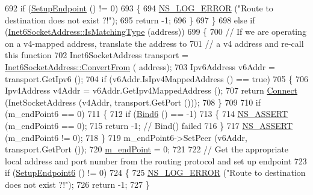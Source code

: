 \begin{DoxyCode}
692       \textcolor{keywordflow}{if} (\hyperlink{classns3_1_1TcpSocketBase_aa1e2094be5e9653b9d8d8d76b7ec670f}{SetupEndpoint} () != 0)
693         \{
694           \hyperlink{group__logging_ga0261a8db1d4ac5f79417d117634fd455}{NS\_LOG\_ERROR} (\textcolor{stringliteral}{"Route to destination does not exist ?!"});
695           \textcolor{keywordflow}{return} -1;
696         \}
697     \}
698   \textcolor{keywordflow}{else} \textcolor{keywordflow}{if} (\hyperlink{classns3_1_1Inet6SocketAddress_a4d928c54affbfb530a12076d6d7e0540}{Inet6SocketAddress::IsMatchingType} (address))
699     \{
700       \textcolor{comment}{// If we are operating on a v4-mapped address, translate the address to}
701       \textcolor{comment}{// a v4 address and re-call this function}
702       Inet6SocketAddress transport = \hyperlink{classns3_1_1Inet6SocketAddress_a2177c66e1bcf17c85dcffb9d2a971f5a}{Inet6SocketAddress::ConvertFrom} (
      address);
703       Ipv6Address v6Addr = transport.GetIpv6 ();
704       \textcolor{keywordflow}{if} (v6Addr.IsIpv4MappedAddress () == \textcolor{keyword}{true})
705         \{
706           Ipv4Address v4Addr = v6Addr.GetIpv4MappedAddress ();
707           \textcolor{keywordflow}{return} \hyperlink{classns3_1_1TcpSocketBase_aabd08c9eb0ee3c88c855eb7268e392bf}{Connect} (InetSocketAddress (v4Addr, transport.GetPort ()));
708         \}
709 
710       \textcolor{keywordflow}{if} (m\_endPoint6 == 0)
711         \{
712           \textcolor{keywordflow}{if} (\hyperlink{classns3_1_1TcpSocketBase_abe62bb701ac4f057199d5c34938a96a9}{Bind6} () == -1)
713             \{
714               \hyperlink{assert_8h_a6dccdb0de9b252f60088ce281c49d052}{NS\_ASSERT} (m\_endPoint6 == 0);
715               \textcolor{keywordflow}{return} -1; \textcolor{comment}{// Bind() failed}
716             \}
717           \hyperlink{assert_8h_a6dccdb0de9b252f60088ce281c49d052}{NS\_ASSERT} (m\_endPoint6 != 0);
718         \}
719       m\_endPoint6->SetPeer (v6Addr, transport.GetPort ());
720       \hyperlink{classns3_1_1TcpSocketBase_a78a4181c0a7394749110ea6b194de467}{m\_endPoint} = 0;
721 
722       \textcolor{comment}{// Get the appropriate local address and port number from the routing protocol and set up endpoint}
723       \textcolor{keywordflow}{if} (\hyperlink{classns3_1_1TcpSocketBase_afe98eecb266502ddd1fdbcfa37442b7a}{SetupEndpoint6} () != 0)
724         \{
725           \hyperlink{group__logging_ga0261a8db1d4ac5f79417d117634fd455}{NS\_LOG\_ERROR} (\textcolor{stringliteral}{"Route to destination does not exist ?!"});
726           \textcolor{keywordflow}{return} -1;
727         \}

\end{DoxyCode}
